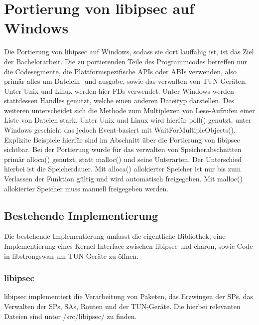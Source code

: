 


\section{Portierung von libipsec auf Windows}
Die Portierung von libipsec auf Windows, sodass sie dort lauffähig ist, ist das Ziel
der Bachelorarbeit. Die zu portierenden Teile des Programmcodes betreffen nur
die Codesegmente, die Plattformspezifische \acp{API} oder \acp{ABI} verwenden,
also primär alles um Dateiein- und ausgabe, sowie das verwalten von TUN-Geräten.
Unter Unix und Linux werden hier \acp{FD} verwendet. Unter Windows werden stattdessen
Handles genutzt, welche einen anderen Dateityp darstellen. Des weiteren unterscheidet
sich die Methode zum Multiplexen von Lese-Aufrufen einer Liste von Dateien stark.
Unter Unix und Linux wird hierfür poll() genutzt, unter Windows geschieht das jedoch
Event-basiert mit WaitForMultipleObjects().
Explizite Beispiele hierfür sind im Abschnitt über die Portierung von libipsec sichtbar.
Bei der Portierung wurde für das verwalten von Speicherabschnitten 
primär alloca() genutzt, statt malloc() und seine Unterarten. Der Unterschied hierbei ist die
Speicherdauer. Mit alloca() allokierter Speicher ist nur bis zum Verlassen der Funktion gültig
und wird automatisch freigegeben. Mit malloc() allokierter Speicher muss manuell freigegeben werden.

\subsection{Bestehende Implementierung}
Die bestehende Implementierung umfasst die eigentliche Bibliothek, eine Implementierung
eines Kernel-Interface zwischen libipsec und charon, sowie Code in libstrongswan
um TUN-Geräte zu öffnen.
\subsubsection{libipsec}
libipsec implementiert die Verarbeitung von Paketen, das Erzwingen der \acp{SP},
das Verwalten der \acp{SP}, \acp{SA}, Routen und der TUN-Geräte.
Die hierbei relevanten Dateien sind unter /src/libipsec/ zu finden.

